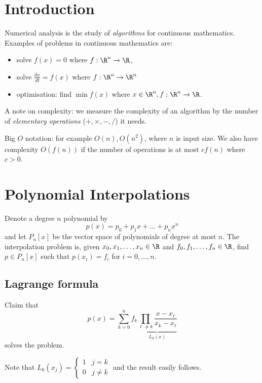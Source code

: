 \documentclass[a4paper]{article}
\begin{document}


\tableofcontents

\setcounter{section}{-1}

\section{Introduction}

Numerical analysis is the study of \emph{algorithms} for continuous mathematics. Examples of problems in continuous mathematics are:
\begin{itemize}
\item solve \(f(x) = 0\) where \(f: \R^n \to \R\),
\item solve \(\frac{dx}{dt} = f(x)\) where \(f: \R^n \to \R^n\)
\item optimisation: find \(\min f(x)\) where \(x \in \R^n, f: \R^n \to \R\).
\end{itemize}

A note on complexity: we measure the complexity of an algorithm by the number of \emph{elementary operations} (\(+, \times, -, /\)) it needs.

Big \(O\) notation: for example \(O(n), O(n^2)\), where \(n\) is input size. We also have complexity \(O(f(n))\) if the number of operations is at most \(cf(n)\) where \(c > 0\).

\section{Polynomial Interpolations}

Denote a degree \(n\) polynomial by
\[
  p(x) = p_0 + p_1x + \dots + p_nx^n
\]
and let \(P_n[x]\) be the vector space of polynomials of degree at most \(n\). The interpolation problem is, given \(x_0, x_1, \dots, x_n \in \R\) and \(f_0, f_1, \dots, f_n \in \R\), find \(p \in P_n[x]\) such that \(p(x_i) = f_i\) for \(i = 0, \dots, n\).

\subsection{Lagrange formula}

Claim that
\[
  p(x) = \sum_{k = 0}^{n} f_k \underbrace{\prod_{\ell \neq k}^{ } \frac{x - x_\ell}{x_k - x_\ell}}_{L_k(x)}
\]
solves the problem.

Note that \(L_k(x_j) = \begin{cases} 1 & j = k \\ 0 &j \neq k \end{cases}\) and the result easily follows.
\end{document}
